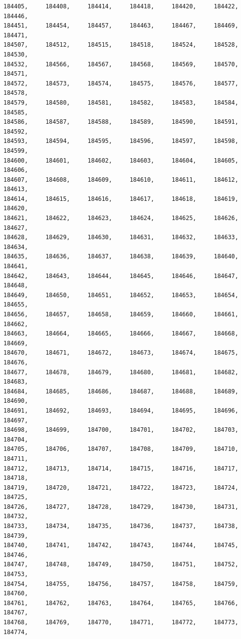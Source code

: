 \documentclass[a4paper,11pt]{report}
\begin{document}
\begin{verbatim}
184405,     184408,     184414,     184418,     184420,     184422,     184446,
184451,     184454,     184457,     184463,     184467,     184469,     184471,
184507,     184512,     184515,     184518,     184524,     184528,     184530,
184532,     184566,     184567,     184568,     184569,     184570,     184571,
184572,     184573,     184574,     184575,     184576,     184577,     184578,
184579,     184580,     184581,     184582,     184583,     184584,     184585,
184586,     184587,     184588,     184589,     184590,     184591,     184592,
184593,     184594,     184595,     184596,     184597,     184598,     184599,
184600,     184601,     184602,     184603,     184604,     184605,     184606,
184607,     184608,     184609,     184610,     184611,     184612,     184613,
184614,     184615,     184616,     184617,     184618,     184619,     184620,
184621,     184622,     184623,     184624,     184625,     184626,     184627,
184628,     184629,     184630,     184631,     184632,     184633,     184634,
184635,     184636,     184637,     184638,     184639,     184640,     184641,
184642,     184643,     184644,     184645,     184646,     184647,     184648,
184649,     184650,     184651,     184652,     184653,     184654,     184655,
184656,     184657,     184658,     184659,     184660,     184661,     184662,
184663,     184664,     184665,     184666,     184667,     184668,     184669,
184670,     184671,     184672,     184673,     184674,     184675,     184676,
184677,     184678,     184679,     184680,     184681,     184682,     184683,
184684,     184685,     184686,     184687,     184688,     184689,     184690,
184691,     184692,     184693,     184694,     184695,     184696,     184697,
184698,     184699,     184700,     184701,     184702,     184703,     184704,
184705,     184706,     184707,     184708,     184709,     184710,     184711,
184712,     184713,     184714,     184715,     184716,     184717,     184718,
184719,     184720,     184721,     184722,     184723,     184724,     184725,
184726,     184727,     184728,     184729,     184730,     184731,     184732,
184733,     184734,     184735,     184736,     184737,     184738,     184739,
184740,     184741,     184742,     184743,     184744,     184745,     184746,
184747,     184748,     184749,     184750,     184751,     184752,     184753,
184754,     184755,     184756,     184757,     184758,     184759,     184760,
184761,     184762,     184763,     184764,     184765,     184766,     184767,
184768,     184769,     184770,     184771,     184772,     184773,     184774,

\end{verbatim}
\end{document}
